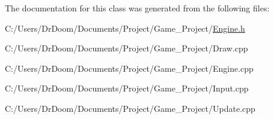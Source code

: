 The documentation for this class was generated from the following files\+:\begin{DoxyCompactItemize}
\item 
C\+:/\+Users/\+Dr\+Doom/\+Documents/\+Project/\+Game\+\_\+\+Project/\hyperlink{_engine_8h}{Engine.\+h}\item 
C\+:/\+Users/\+Dr\+Doom/\+Documents/\+Project/\+Game\+\_\+\+Project/Draw.\+cpp\item 
C\+:/\+Users/\+Dr\+Doom/\+Documents/\+Project/\+Game\+\_\+\+Project/Engine.\+cpp\item 
C\+:/\+Users/\+Dr\+Doom/\+Documents/\+Project/\+Game\+\_\+\+Project/Input.\+cpp\item 
C\+:/\+Users/\+Dr\+Doom/\+Documents/\+Project/\+Game\+\_\+\+Project/Update.\+cpp\end{DoxyCompactItemize}
